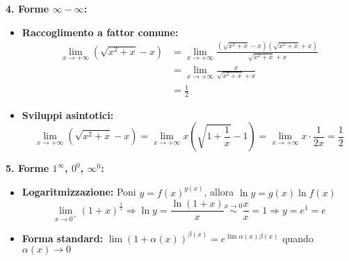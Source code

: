 \begin{info}
\textbf{4. Forme $\infty - \infty$:}
\begin{itemize}
    \item \textbf{Raccoglimento a fattor comune:}
    \[
    \begin{aligned}
    \lim_{x \to +\infty} (\sqrt{x^2 + x} - x) 
    &= \lim_{x \to +\infty} \frac{(\sqrt{x^2 + x} - x)(\sqrt{x^2 + x} + x)}{\sqrt{x^2 + x} + x} \\
    &= \lim_{x \to +\infty} \frac{x}{\sqrt{x^2 + x} + x} \\
    &= \frac{1}{2}
    \end{aligned}
    \]
    
    \item \textbf{Sviluppi asintotici:}
    \[ \lim_{x \to +\infty} (\sqrt{x^2 + x} - x) = \lim_{x \to +\infty} x\left(\sqrt{1 + \frac{1}{x}} - 1\right) = \lim_{x \to +\infty} x \cdot \frac{1}{2x} = \frac{1}{2} \]
\end{itemize}

\textbf{5. Forme $1^{\infty}$, $0^0$, $\infty^0$:}
\begin{itemize}
    \item \textbf{Logaritmizzazione:} Poni $y = f(x)^{g(x)}$, allora $\ln y = g(x) \ln f(x)$
    \[ \lim_{x \to 0^+} (1 + x)^{\frac{1}{x}} \Rightarrow \ln y = \frac{\ln(1 + x)}{x} \stackrel{x \to 0}{\sim} \frac{x}{x} = 1 \Rightarrow y = e^1 = e \]
    
    \item \textbf{Forma standard:} $\lim (1 + \alpha(x))^{\beta(x)} = e^{\lim \alpha(x) \beta(x)}$ quando $\alpha(x) \to 0$
\end{itemize}
\end{info}


